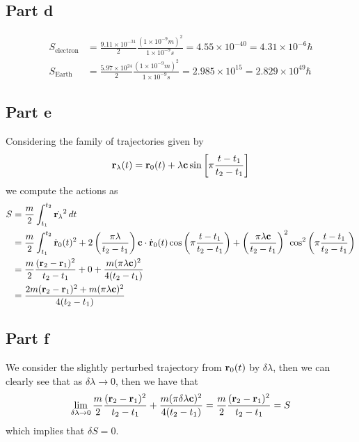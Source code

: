 \documentclass[12pt]{report}
\newcommand{\rb}{\bold{r}}
\begin{document}
\subsection*{Part d}
\begin{align*}
    S_{\text{electron}} &= \frac{9.11 \times 10^{-31}}{2}\frac{(1 \times 10^{-9} \si{m})^2}{1 \times 10^{-9}\si{s}} = 4.55 \times 10^{-40} = 4.31\times 10^{-6} \hbar \\
    S_{\text{Earth}} &= \frac{5.97 \times 10^{24} }{2}\frac{(1 \times 10^{-9} \si{m})^2}{1 \times 10^{-9}\si{s}} = 2.985 \times 10^{15} = 2.829 \times 10^{49} \hbar
\end{align*}

\subsection*{Part e}
Considering the family of trajectories given by
\begin{equation*}
    \rb_\lambda(t) = \rb_0(t) + \lambda \bold{c} \sin\left[\pi \frac{t-t_1}{t_2 - t_1}\right]
\end{equation*}
we compute the actions as
\begin{align*}
    S &= \frac{m}{2} \int_{t_1}^{t_2} \dot{\rb_\lambda}^2 \, dt \\
      &= \frac{m}{2} \int_{t_1}^{t_2} \dot{\rb}_0(t)^2 + 2 \left(\frac{\pi \lambda}{t_2 -t_1}\right)\bold{c} \cdot \dot{\rb}_0(t) \cos\left(\pi \frac{t - t_1}{t_2 - t_1}\right) + \left(\frac{\pi \lambda \bold{c}}{t_2 -t_1}\right)^2 \cos^2\left(\pi \frac{t - t_1}{t_2 - t_1}\right) \\
      &=  \frac{m}{2}\frac{(\rb_2 - \rb_1)^2}{t_2 - t_1} + 0 + \frac{m(\pi \lambda \bold{c})^2}{4(t_2-t_1)} \\
      &= \frac{2m(\rb_2 - \rb_1)^2 + m(\pi\lambda \bold{c})^2}{4(t_2-t_1)}
\end{align*}

\subsection*{Part f}
We consider the slightly perturbed trajectory from $\rb_0(t)$ by $\delta \lambda$, then we can clearly see that as $\delta \lambda \to 0$, then we have that
\begin{equation*}
    \lim_{\delta \lambda \to 0} \frac{m}{2}\frac{(\rb_2 - \rb_1)^2}{t_2 - t_1} + \frac{m(\pi \delta\lambda \bold{c})^2}{4(t_2-t_1)} = \frac{m}{2}\frac{(\rb_2 - \rb_1)^2}{t_2 - t_1} = S
\end{equation*}
which implies that $\delta S = 0$.
\end{document}
